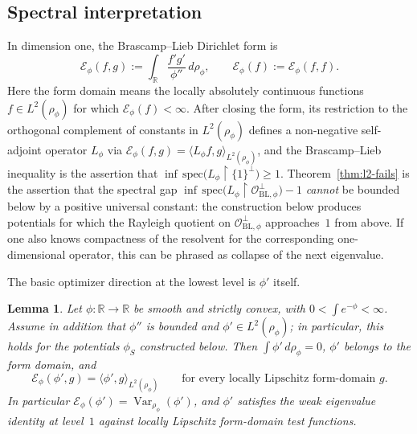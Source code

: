 \documentclass{article}
\newtheorem{lemma}[theorem]{Lemma}
\theoremstyle{remark}
\DeclareMathOperator{\Var}{Var}
\begin{document}
\subsection*{Spectral interpretation}

In dimension one, the Brascamp--Lieb Dirichlet form is
\begin{equation}\label{eq:BL-form}
  \mathcal E_\phi(f,g)
  := \int_{\mathbb R}\frac{f'g'}{\phi''}\,d\rho_\phi,
  \qquad
  \mathcal E_\phi(f) := \mathcal E_\phi(f,f).
\end{equation}
Here the form domain means the locally absolutely continuous functions
$f\in L^2(\rho_\phi)$ for which $\mathcal E_\phi(f)<\infty$.
After closing the form, its restriction to the orthogonal complement of
constants in $L^2(\rho_\phi)$ defines a non-negative self-adjoint operator
$L_\phi$ via
$\mathcal E_\phi(f,g)=\langle L_\phi f,g\rangle_{L^2(\rho_\phi)}$, and the
Brascamp--Lieb inequality is the assertion that
$\inf\,\mathrm{spec}\bigl(L_\phi\restriction\{1\}^\perp\bigr)\ge 1$.
Theorem~\ref{thm:l2-fails} is the assertion that the spectral gap
$\inf\,\mathrm{spec}\bigl(L_\phi\restriction \mathcal O_{\mathrm{BL},\phi}^\perp\bigr)-1$
\emph{cannot} be bounded below by a positive universal constant: the
construction below produces potentials for which the Rayleigh quotient on
$\mathcal O_{\mathrm{BL},\phi}^\perp$ approaches~$1$ from above. If one also
knows compactness of the resolvent for the corresponding one-dimensional
operator, this can be phrased as collapse of the next eigenvalue.

The basic optimizer direction at the lowest level is $\phi'$ itself.

\begin{lemma}\label{lem:phi-prime-eigen}
Let $\phi:\mathbb R\to\mathbb R$ be smooth and strictly convex, with
$0<\int e^{-\phi}<\infty$. Assume in addition that $\phi''$ is bounded and
$\phi'\in L^2(\rho_\phi)$; in particular, this holds for the potentials
$\phi_S$ constructed below. Then $\int\phi'\,d\rho_\phi=0$, $\phi'$ belongs to
the form domain, and
\[
  \mathcal E_\phi(\phi',g)=\langle\phi',g\rangle_{L^2(\rho_\phi)}
  \qquad\text{for every locally Lipschitz form-domain }g.
\]
In particular $\mathcal E_\phi(\phi')=\Var_{\rho_\phi}(\phi')$, and
$\phi'$ satisfies the weak eigenvalue identity at level~$1$ against locally
Lipschitz form-domain test functions.
\end{lemma}
\end{document}
